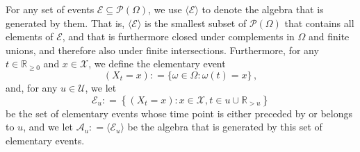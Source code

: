 \documentclass[10pt,a4paper]{paper}
\theoremstyle{definition}
\newcommand{\nats}{\mathbb{N}}
\newcommand{\reals}{\mathbb{R}}
\newcommand{\realsnonneg}{\reals_{\geq 0}}
\newcommand{\states}{\mathcal{X}}
\newcommand{\paths}{\Omega}
\newcommand{\power}{\mathcal{P}(\paths)}
\newcommand{\nonemptypower}{\power_{\emptyset}}
\newcommand{\events}{\mathcal{E}}
\newcommand{\filter}[1][t]{\mathcal{F}_{#1}}
\newcommand{\coloneqq}{:\!=}
\begin{document}
For any set of events $\mathcal{E}\subseteq\power$, we use $\langle\mathcal{E}\rangle$ to denote the algebra that is generated by them. That is, $\langle\mathcal{E}\rangle$ is the smallest subset of $\power$ that contains all elements of $\mathcal{E}$, and that is furthermore closed under complements in $\Omega$ and finite unions, and therefore also under finite intersections. 
Furthermore, for any $t\in\realsnonneg$ and $x\in\states$, we define the elementary event
\begin{equation*}
(X_t=x)\coloneqq\{\omega\in\paths\colon\omega(t)=x\}\,,
\end{equation*}
%
%
and, for any $u\in\mathcal{U}$, we let
\begin{equation*}
\mathcal{E}_u \coloneqq \left\{
(X_t=x)
\colon
x\in\states,t\in u\cup\reals_{>u}
\right\}
\end{equation*}
be the set of elementary events whose time point is either preceded by or belongs to $u$, and we let $\mathcal{A}_u\coloneqq\langle\mathcal{E}_u\rangle$ be the algebra that is generated by this set of elementary events. 
\end{document}
